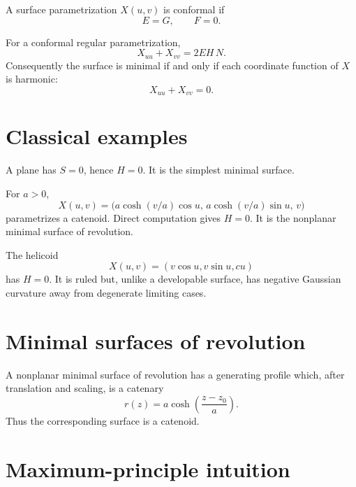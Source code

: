 \begin{definition}\label{def:vii19-conformal}
A surface parametrization \(X(u,v)\) is conformal if
\[
E=G,\qquad F=0.
\]
\end{definition}

\begin{theorem}\label{thm:vii19-harmonic}
For a conformal regular parametrization,
\[
X_{uu}+X_{vv}=2EH\,N.
\]
Consequently the surface is minimal if and only if each coordinate function of
\(X\) is harmonic:
\[
X_{uu}+X_{vv}=0.
\]
\end{theorem}

\section{Classical examples}

\begin{example}[Plane]\label{ex:vii19-plane}
A plane has \(S=0\), hence \(H=0\).  It is the simplest minimal surface.
\end{example}

\begin{example}[Catenoid]\label{ex:vii19-catenoid}
For \(a>0\),
\[
X(u,v)=
\bigl(a\cosh(v/a)\cos u,\,
      a\cosh(v/a)\sin u,\,
      v\bigr)
\]
parametrizes a catenoid.  Direct computation gives \(H=0\).
It is the nonplanar minimal surface of revolution.
\end{example}

\begin{example}[Helicoid]\label{ex:vii19-helicoid}
The helicoid
\[
X(u,v)=(v\cos u,v\sin u,cu)
\]
has \(H=0\).  It is ruled but, unlike a developable surface, has negative Gaussian
curvature away from degenerate limiting cases.
\end{example}

\section{Minimal surfaces of revolution}

\begin{theorem}\label{thm:vii19-revolution}
A nonplanar minimal surface of revolution has a generating profile which, after
translation and scaling, is a catenary
\[
r(z)=a\cosh\!\left(\frac{z-z_0}{a}\right).
\]
Thus the corresponding surface is a catenoid.
\end{theorem}

\section{Maximum-principle intuition}

